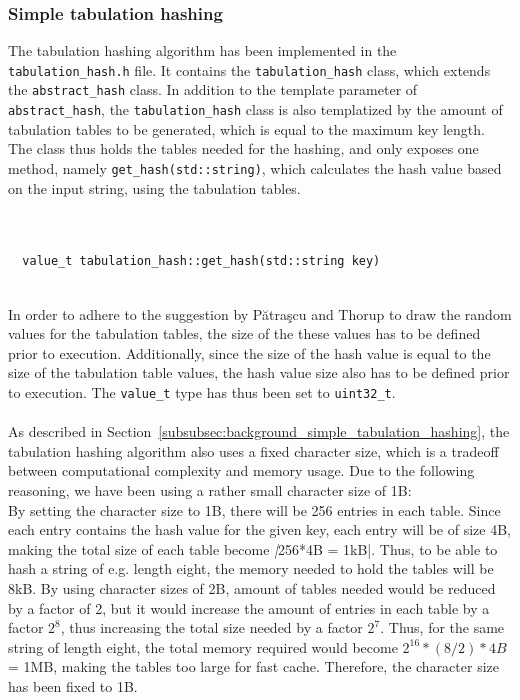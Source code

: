 \documentclass[11pt]{article} %
\begin{document}
\subsubsection{Simple tabulation hashing}
\label{subsubsec:implementation_tabulation_hash}
The tabulation hashing algorithm has been implemented in the \verb=tabulation_hash.h= file. It contains the \verb|tabulation_hash| class, which extends the \verb|abstract_hash| class. In addition to the template parameter of \verb|abstract_hash|, the \verb|tabulation_hash| class is also templatized by the amount of tabulation tables to be generated, which is equal to the maximum key length. The class thus holds the tables needed for the hashing, and only exposes one method, namely \verb|get_hash(std::string)|, which calculates the hash value based on the input string, using the tabulation tables. \\
\\
\begin{fminipage}{\textwidth}
\begin{lstlisting}[]  % Start your code-block

  value_t tabulation_hash::get_hash(std::string key)
\end{lstlisting}
\end{fminipage}
\vphantom{fill}\\
In order to adhere to the suggestion by Pătraşcu and Thorup to draw the random values for the tabulation tables, the size of the these values has to be defined prior to execution. Additionally, since the size of the hash value is equal to the size of the tabulation table values, the hash value size also has to be defined prior to execution. The \verb|value_t| type has thus been set to \verb|uint32_t|. \\
\\
As described in Section~\ref{subsubsec:background_simple_tabulation_hashing}, the tabulation hashing algorithm also uses a fixed character size, which is a tradeoff between computational complexity and memory usage. Due to the following reasoning, we have been using a rather small character size of 1B: \\
By setting the character size to 1B, there will be 256 entries in each table. Since each entry contains the hash value for the given key, each entry will be of size 4B, making the total size of each table become \emph|256*4B = 1kB|. Thus, to be able to hash a string of e.g. length eight, the memory needed to hold the tables will be 8kB. By using character sizes of 2B, amount of tables needed would be reduced by a factor of 2, but it would increase the amount of entries in each table by a factor $2^{8}$, thus increasing the total size needed by a factor $2^7$. Thus, for the same string of length eight, the total memory required would become $2^{16}*(8/2)*4B$ = 1MB, making the tables too large for fast cache. Therefore, the character size has been fixed to 1B.\\
\end{document}
